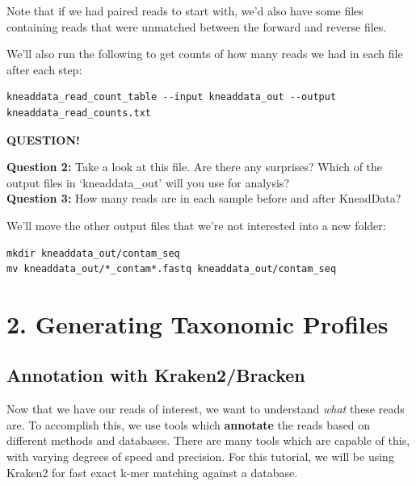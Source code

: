 \documentclass[
]{book}
\newenvironment{bluebox}{
  \definecolor{shadecolor}{RGB}{172, 210, 237}
  \color{white}
  \begin{shaded}}
 {\end{shaded}}
\begin{document}
Note that if we had paired reads to start with, we'd also have some files containing reads that were unmatched between the forward and reverse files.

We'll also run the following to get counts of how many reads we had in each file after each step:

\begin{verbatim}
kneaddata_read_count_table --input kneaddata_out --output kneaddata_read_counts.txt
\end{verbatim}

\begin{bluebox}

\begin{center}
\textbf{QUESTION!}

\end{center}

\textbf{Question 2:} Take a look at this file. Are there any surprises? Which of the output files in `kneaddata\_out' will you use for analysis?\\
\textbf{Question 3:} How many reads are in each sample before and after KneadData?

\end{bluebox}

We'll move the other output files that we're not interested into a new folder:

\begin{verbatim}
mkdir kneaddata_out/contam_seq
mv kneaddata_out/*_contam*.fastq kneaddata_out/contam_seq
\end{verbatim}

\section{2. Generating Taxonomic Profiles}\label{generating-taxonomic-profiles}

\subsection{Annotation with Kraken2/Bracken}\label{annotation-with-kraken2bracken}

Now that we have our reads of interest, we want to understand \emph{what} these reads are. To accomplish this, we use tools which \textbf{annotate} the reads based on different methods and databases. There are many tools which are capable of this, with varying degrees of speed and precision. For this tutorial, we will be using Kraken2 for fast exact k-mer matching against a database.
\end{document}
